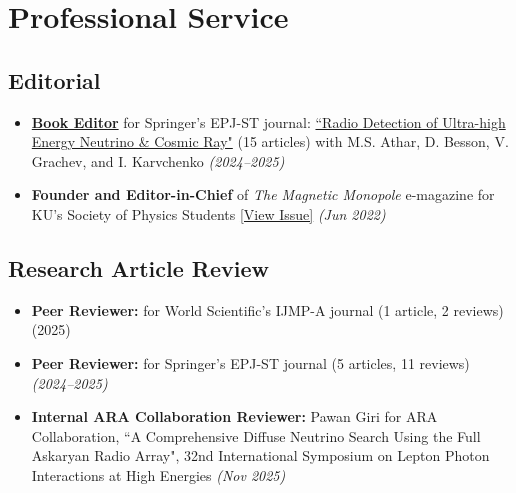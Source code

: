 \documentclass[10pt]{report}
\begin{document}
\section*{Professional Service}
\subsection*{Editorial}
\begin{itemize}
    \item \hyperlink{appendixpage}{\bfseries Book Editor} for Springer's EPJ-ST journal: \href{https://link.springer.com/collections/ediiddhcdc}{``Radio Detection of Ultra-high Energy Neutrino \& Cosmic Ray"} (15 articles) with M.S. Athar, D. Besson, V. Grachev, and I. Karvchenko  \textit{(2024--2025)}

    \vspace{0.1em}
    \noindent  
    \item {\bf Founder and Editor-in-Chief} of \textit{The Magnetic Monopole} e-magazine for KU's Society of Physics Students    \href{https://drive.google.com/file/d/12yfhWqUupWIPWM5WcWdIviUYbVA2GnWY/view?usp=sharing}{[View Issue]}  \textit{(Jun 2022)}
\end{itemize}

\subsection*{Research Article Review}
\begin{itemize}

    \item {\bf Peer Reviewer:} for World Scientific's IJMP-A journal (1 article, 2 reviews) (2025)

    \vspace{0.0em}
    \noindent  
    \item {\bf Peer Reviewer:} for Springer's EPJ-ST journal (5 articles, 11 reviews) \textit{(2024--2025)}

    \vspace{0.0em}
    \noindent  
    \item {\bf Internal ARA Collaboration Reviewer:} Pawan Giri for ARA Collaboration, ``A Comprehensive Diffuse Neutrino Search Using the Full Askaryan Radio Array", 32nd International Symposium on Lepton Photon Interactions at High Energies \textit{(Nov 2025)}

\end{itemize}
\end{document}
